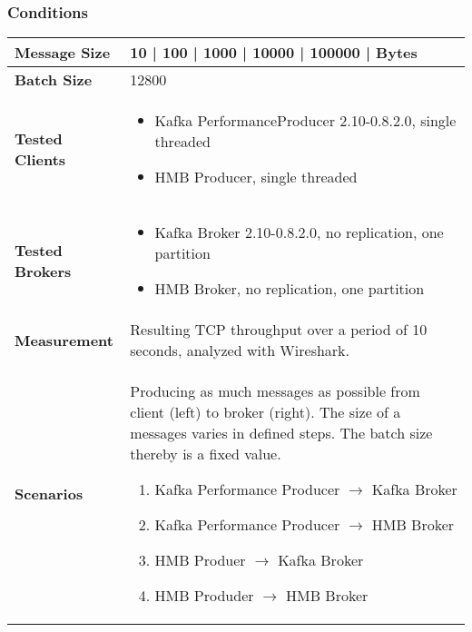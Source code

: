 \subsubsection{Conditions}
\begin{table}[H]
\begin{tabular}{|l| p{12cm}|} \hline
{\bf Message Size}   & 10 | 100 | 1000 | 10000 | 100000 | Bytes \\ \hline
{\bf Batch Size}     & 12800 \\ \hline
{\bf Tested Clients} &
    \begin{itemize}
        \item Kafka PerformanceProducer 2.10-0.8.2.0, single threaded
        \item HMB Producer, single threaded
    \end{itemize}\\ \hline
{\bf Tested Brokers} &
    \begin{itemize}
        \item Kafka Broker 2.10-0.8.2.0, no replication, one partition
        \item HMB Broker, no replication, one partition
    \end{itemize}\\ \hline
{\bf Measurement} & Resulting TCP throughput over a period of 10 seconds, analyzed with
    Wireshark. \\ \hline
{\bf Scenarios} & Producing as much messages as possible from client (left) to broker (right).
    The size of a messages varies in defined steps. The batch size thereby is a fixed value. 
  \begin{enumerate}
        \item Kafka Performance Producer $\rightarrow$ Kafka Broker
        \item Kafka Performance Producer $\rightarrow$ HMB Broker
        \item HMB Produer $\rightarrow$ Kafka Broker
        \item HMB Produder $\rightarrow$ HMB Broker
    \end{enumerate} \\ \hline
\end{tabular}
\end{table}

